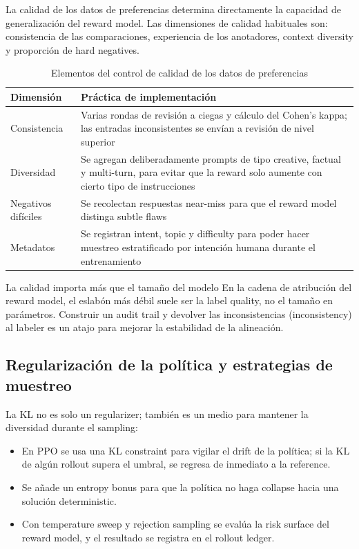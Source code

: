 \documentclass[a4paper]{article}
\begin{document}
La calidad de los datos de preferencias determina directamente la capacidad de generalización del reward model. Las dimensiones de calidad habituales son: consistencia de las comparaciones, experiencia de los anotadores, context diversity y proporción de hard negatives.

\begin{table}[H]
\centering
\begin{tabular}{p{} p{}}
\toprule
Dimensión & Práctica de implementación \\
\midrule
Consistencia & Varias rondas de revisión a ciegas y cálculo del Cohen's kappa; las entradas inconsistentes se envían a revisión de nivel superior \\
Diversidad & Se agregan deliberadamente prompts de tipo creative, factual y multi-turn, para evitar que la reward solo aumente con cierto tipo de instrucciones \\
Negativos difíciles & Se recolectan respuestas near-miss para que el reward model distinga subtle flaws \\
Metadatos & Se registran intent, topic y difficulty para poder hacer muestreo estratificado por intención humana durante el entrenamiento \\
\bottomrule
\end{tabular}
\caption{Elementos del control de calidad de los datos de preferencias}
\end{table}

\begin{knowledgebox}{La calidad importa más que el tamaño del modelo}
En la cadena de atribución del reward model, el eslabón más débil suele ser la label quality, no el tamaño en parámetros. Construir un audit trail y devolver las inconsistencias (inconsistency) al labeler es un atajo para mejorar la estabilidad de la alineación.
\end{knowledgebox}

\subsection{Regularización de la política y estrategias de muestreo}

La KL no es solo un regularizer; también es un medio para mantener la diversidad durante el sampling:
\begin{itemize}
    \item En PPO se usa una KL constraint para vigilar el drift de la política; si la KL de algún rollout supera el umbral, se regresa de inmediato a la reference.
    \item Se añade un entropy bonus para que la política no haga collapse hacia una solución deterministic.
    \item Con temperature sweep y rejection sampling se evalúa la risk surface del reward model, y el resultado se registra en el rollout ledger.
\end{itemize}
\end{document}
